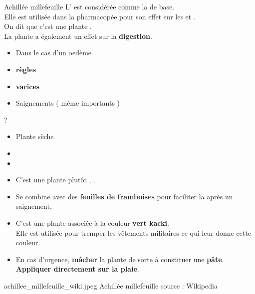 
\ficheidentiteplante
{Achillée millefeuille}
{%
    L' est considérée comme la  de base.\\ 
    Elle est utilisée dans la pharmacopée pour son effet sur les  et .\\
    On dit que c'est une plante .\\

    La plante a également un effet sur la \textbf{digestion}.
}
{%
    \begin{itemize}[label = \bcplume]
        \item Dans le cas d'un oedème
        \item \textbf{règles}
        \item \textbf{varices}
        \item Saignements ( même importants )
    \end{itemize}
}
{%
    ?
}
{%
    \begin{itemize}[label = \bccrayon]
        \item Plante sèche
        \item {}
        \item {}
    \end{itemize}
}
{%
    \begin{itemize}[label = \bcplume]
        \item C'est une plante plutôt , .
        \item Se combine avec des \textbf{feuilles de framboises} pour faciliter la  après un saignement.
        \item C'est une plante  associée à la couleur \textbf{vert kacki}.\\Elle est utilisée pour tremper les vêtements militaires ce qui leur donne cette couleur. 
        \item[\bcattention] En cas d'urgence, \textbf{mâcher} la plante de sorte à constituer une \textbf{pâte}.\\ \textbf{Appliquer directement sur la plaie}.
    \end{itemize}
}
{%
    achillee_millefeuille_wiki.jpeg
}
{%
    Achillée millefeuille
}
{%
    source : Wikipedia 
}
